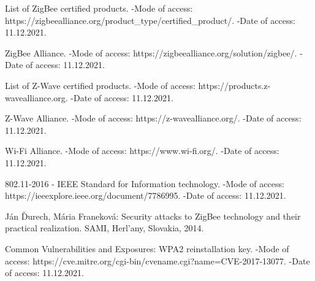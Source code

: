 \newpage
 	
	 \begin{thebibliography}{1}
	 	
	 	 List of ZigBee certified products. -Mode of access: 
	 	\newline https://zigbeealliance.org/product\_type/certified\_product/. -Date of access: 11.12.2021.
	 	
	 	 ZigBee Alliance. -Mode of access: 
	 	\newline https://zigbeealliance.org/solution/zigbee/. -Date of access: 11.12.2021.
	 	
	 	 List of Z-Wave certified products. -Mode of access: 
	 	\newline https://products.z-wavealliance.org. -Date of access: 11.12.2021.
	 	
	 	 Z-Wave Alliance. -Mode of access: 
	 	\newline https://z-wavealliance.org/. -Date of access: 11.12.2021.
	 	
	 	 Wi-Fi Alliance. -Mode of access: 
	 	\newline https://www.wi-fi.org/. -Date of access: 11.12.2021.
	 	
	 	 802.11-2016 - IEEE Standard for Information technology. -Mode of access: 
	 	\newline https://ieeexplore.ieee.org/document/7786995. -Date of access: 11.12.2021.
	 	
	 	 Ján Ďurech, Mária Franeková: Security attacks to ZigBee technology and their practical realization. 
	 	SAMI,  Herl’any, Slovakia, 2014.
	 	
	 	 Common Vulnerabilities and Exposures: WPA2 reinstallation key. -Mode of access: 
	    https://cve.mitre.org/cgi-bin/cvename.cgi?name=CVE-2017-13077.  \newline -Date of access: 11.12.2021.
	 	
	 \end{thebibliography}